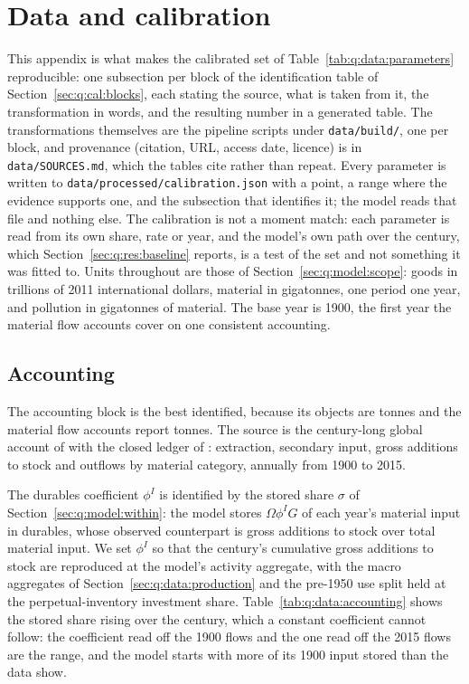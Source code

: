 \section{Data and calibration}\label{sec:q:data}

This appendix is what makes the calibrated set of Table~\ref{tab:q:data:parameters} reproducible: one subsection per block of the identification table of Section~\ref{sec:q:cal:blocks}, each stating the source, what is taken from it, the transformation in words, and the resulting number in a generated table. The transformations themselves are the pipeline scripts under \texttt{data/build/}, one per block, and provenance (citation, URL, access date, licence) is in \texttt{data/SOURCES.md}, which the tables cite rather than repeat. Every parameter is written to \texttt{data/processed/calibration.json} with a point, a range where the evidence supports one, and the subsection that identifies it; the model reads that file and nothing else. The calibration is not a moment match: each parameter is read from its own share, rate or year, and the model's own path over the century, which Section~\ref{sec:q:res:baseline} reports, is a test of the set and not something it was fitted to. Units throughout are those of Section~\ref{sec:q:model:scope}: goods in trillions of 2011 international dollars, material in gigatonnes, one period one year, and pollution in gigatonnes of material. The base year is 1900, the first year the material flow accounts cover on one consistent accounting.



\subsection{Accounting}\label{sec:q:data:accounting}

The accounting block is the best identified, because its objects are tonnes and the material flow accounts report tonnes. The source is the century-long global account of \textcite{krausmann2018} with the closed ledger of \textcite{haas2020}: extraction, secondary input, gross additions to stock and outflows by material category, annually from 1900 to 2015.

The durables coefficient $\phi^I$ is identified by the stored share $\sigma$ of Section~\ref{sec:q:model:within}: the model stores $\Omega\phi^IG$ of each year's material input in durables, whose observed counterpart is gross additions to stock over total material input. We set $\phi^I$ so that the century's cumulative gross additions to stock are reproduced at the model's activity aggregate, with the macro aggregates of Section~\ref{sec:q:data:production} and the pre-1950 use split held at the perpetual-inventory investment share. Table~\ref{tab:q:data:accounting} shows the stored share rising over the century, which a constant coefficient cannot follow: the coefficient read off the 1900 flows and the one read off the 2015 flows are the range, and the model starts with more of its 1900 input stored than the data show.

